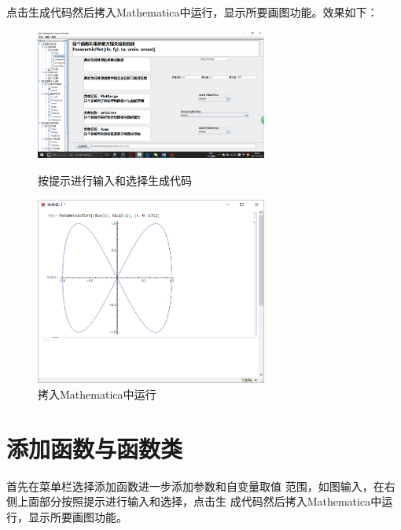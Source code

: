 \documentclass[hyperref, UTF8
,bookmarksnumbered=true, oneside]{ctexbook}
\begin{document}
		点击生成代码然后拷入Mathematica中运行，显示所要画图功能。效果如下：
		\bigskip
		\bigskip
		\begin{figure}[!h]
	        \begin{minipage}[b]{0.45\textwidth}
            \centering
            \includegraphics[width=3in]{6.png}
	        \caption{按提示进行输入和选择生成代码}
	        \label{pic:MathPack}
	        \end{minipage}%
	        \hspace{0.1\textwidth}%
	        \begin{minipage}[b]{0.45\textwidth}
	        \centering
	        \includegraphics[width=3in]{7.png}
	        \caption{拷入Mathematica中运行}
	        \label{pic:GUIPack}
	        \end{minipage}
        \end{figure}
        \bigskip
        \bigskip
    \section{添加函数与函数类}
    首先在菜单栏选择添加函数进一步添加参数和自变量取值
	范围，如图输入，在右侧上面部分按照提示进行输入和选择，点击生
	成代码然后拷入Mathematica中运行，显示所要画图功能。
\end{document}
